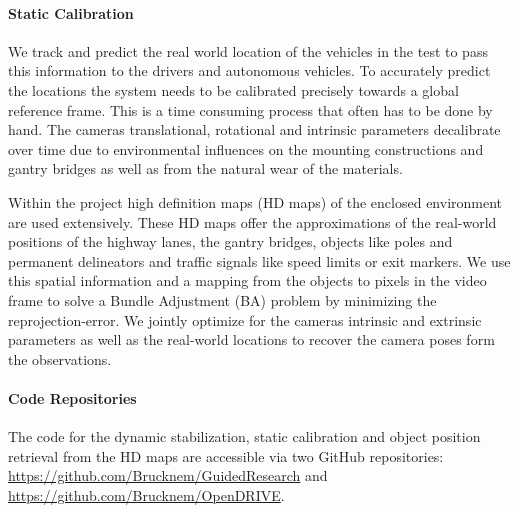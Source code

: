 \paragraph{Static Calibration}
We track and predict the real world location of the vehicles in the test to pass this information to the drivers and autonomous vehicles. 
To accurately predict the locations the system needs to be calibrated precisely towards a global reference frame. 
This is a time consuming process that often has to be done by hand. 
The cameras translational, rotational and intrinsic parameters decalibrate over time due to environmental influences on the mounting constructions and gantry bridges as well as from the natural wear of the materials.

Within the project high definition maps (HD maps) of the enclosed environment are used extensively. 
These HD maps offer the approximations of the real-world positions of the highway lanes, the gantry bridges, objects like poles and permanent delineators and traffic signals like speed limits or exit markers.
We use this spatial information and a mapping from the objects to pixels in the video frame to solve a Bundle Adjustment (BA) problem by minimizing the reprojection-error.
We jointly optimize for the cameras intrinsic and extrinsic parameters as well as the real-world locations to recover the camera poses form the observations.

\paragraph{Code Repositories}
The code for the dynamic stabilization, static calibration and object position retrieval from the HD maps are accessible via two GitHub repositories: \url{https://github.com/Brucknem/GuidedResearch} and \url{https://github.com/Brucknem/OpenDRIVE}.
